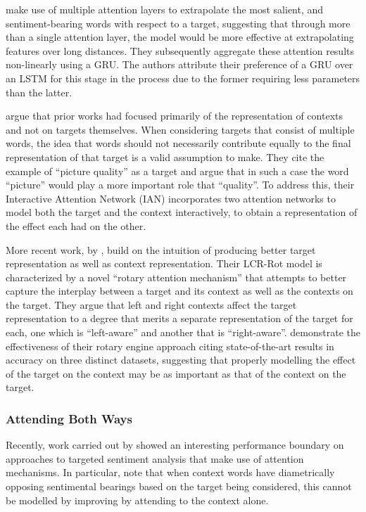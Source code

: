 \documentclass[../../fyp.tex]{subfiles}
\begin{document}
\cite{chen2017} make use of multiple attention layers to extrapolate the most salient, and sentiment-bearing words with respect to a target, suggesting that through more than a single attention layer, the model would be more effective at extrapolating features over long distances. They subsequently aggregate these attention results non-linearly using a GRU. The authors attribute their preference of a GRU over an LSTM for this stage in the process due to the former requiring less parameters than the latter.

\cite{dehongma2017} argue that prior works had focused primarily of the representation of contexts and not on targets themselves. When considering targets that consist of multiple words, the idea that words should not necessarily contribute equally to the final representation of that target is a valid assumption to make. They cite the example of \enquote{picture quality} as a target and argue that in such a case the word \enquote{picture} would play a more important role that \enquote{quality}. To address this, their Interactive Attention Network (IAN) incorporates two attention networks to model both the target and the context interactively, to obtain a representation of the effect each had on the other.

More recent work, by \cite{zheng2018}, build on the intuition of producing better target representation as well as context representation. Their LCR-Rot model is characterized by a novel \enquote{rotary attention mechanism} that attempts to better capture the interplay between a target and its context as well as the contexts on the target. They argue that left and right contexts affect the target representation to a degree that merits a separate representation of the target for each, one which is \enquote{left-aware} and another that is \enquote{right-aware}. \cite{zheng2018} demonstrate the effectiveness of their rotary engine approach citing state-of-the-art results in accuracy on three distinct datasets, suggesting that properly modelling the effect of the target on the context may be as important as that of the context on the target.

\subsubsection{Attending Both Ways}
Recently, work carried out by \cite{wang2018} showed an interesting performance boundary on approaches to targeted sentiment analysis that make use of attention mechanisms. In particular, \cite{wang2018} note that when context words have diametrically opposing sentimental bearings based on the target being considered, this cannot be modelled by improving by attending to the context alone.
\end{document}
